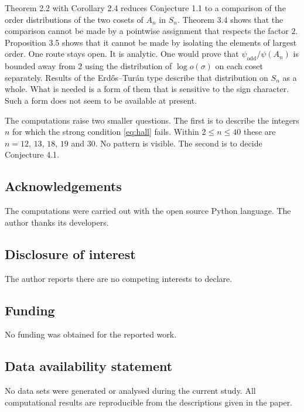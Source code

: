 \documentclass[10pt]{article}
\begin{document}
Theorem 2.2 with Corollary 2.4 reduces Conjecture 1.1 to a comparison of the order
distributions of the two cosets of $A_n$ in $S_n$. Theorem 3.4 shows that the comparison
cannot be made by a pointwise assignment that respects the factor $2$. Proposition 3.5 shows
that it cannot be made by isolating the elements of largest order. One route stays open. It
is analytic. One would prove that $\psi_{\mathrm{odd}}/\psi(A_n)$ is bounded away from $2$
using the distribution of $\log o(\sigma)$ on each coset separately. Results of the
Erd\H{o}s--Tur\'an type describe that distribution on $S_n$ as a whole. What is needed is a
form of them that is sensitive to the sign character. Such a form does not seem to be
available at present.

The computations raise two smaller questions. The first is to describe the integers $n$ for
which the strong condition \eqref{eq:hall} fails. Within $2\le n\le40$ these are $n=12$,
$13$, $18$, $19$ and $30$. No pattern is visible. The second is to decide Conjecture 4.1.

\subsection*{Acknowledgements}
The computations were carried out with the open source \textsf{Python} language. The author
thanks its developers.

\subsection*{Disclosure of interest}
The author reports there are no competing interests to declare.

\subsection*{Funding}
No funding was obtained for the reported work.

\subsection*{Data availability statement}
No data sets were generated or analysed during the current study. All computational results
are reproducible from the descriptions given in the paper.
\end{document}
